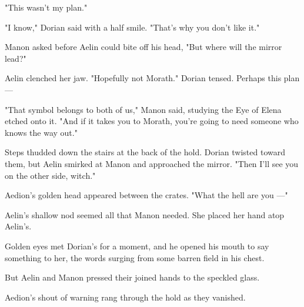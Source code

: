 "This wasn't my plan."

"I know," Dorian said with a half smile.
"That's why you don't like it."

Manon asked before Aelin could bite off his head, "But where will the mirror lead?"

Aelin clenched her jaw.
"Hopefully not Morath."
Dorian tensed.
Perhaps this plan---

"That symbol belongs to both of us," Manon said, studying the Eye of Elena etched onto it.
"And if it takes you to Morath, you're going to need someone who knows the way out."

Steps thudded down the stairs at the back of the hold.
Dorian twisted toward them, but Aelin smirked at Manon and approached the mirror.
"Then I'll see you on the other side, witch."

Aedion's golden head appeared between the crates.
"What the hell are you ---"

Aelin's shallow nod seemed all that Manon needed.
She placed her hand atop Aelin's.

Golden eyes met Dorian's for a moment, and he opened his mouth to say something to her, the words surging from some barren field in his chest.

But Aelin and Manon pressed their joined hands to the speckled glass.

Aedion's shout of warning rang through the hold as they vanished.
